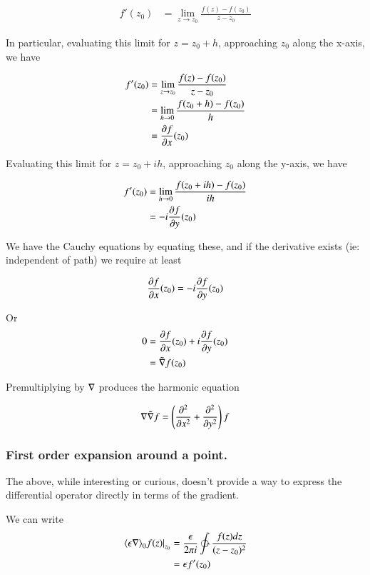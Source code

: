 \documentclass{article}
\newcommand{\PDSq}[2]{\frac{\partial^2 {#2}}{\partial {#1}^2}}
\begin{document}
\begin{align*}
f'(z_0) &= \lim_{z \rightarrow z_0} \frac{ f(z) - f(z_0) }{ z - z_0}
\end{align*}

In particular, evaluating this limit for $z = z_0 + h$, approaching $z_0$ along the x-axis, we have

\begin{align*}
f'(z_0) 
&= \lim_{z \rightarrow z_0} \frac{ f(z) - f(z_0) }{ z - z_0} \\
&= \lim_{h \rightarrow 0} \frac{ f(z_0 + h) - f(z_0) }{ h } \\
&= \PD{x}{f}(z_0)
\end{align*}

Evaluating this limit for $z = z_0 + i h$, approaching $z_0$ along the y-axis, we have

\begin{align*}
f'(z_0) 
&= \lim_{h \rightarrow 0} \frac{ f(z_0 + i h) - f(z_0) }{ i h } \\
&= -i \PD{y}{f}(z_0)
\end{align*}

We have the Cauchy equations by equating these, and if the derivative exists (ie: independent of path) we require at least

\begin{align*}
\PD{x}{f}(z_0) =
-i \PD{y}{f}(z_0)
\end{align*}

Or
\begin{align*}
0 
&=
\PD{x}{f}(z_0) + i \PD{y}{f}(z_0) \\
&=
\tilde{\grad} f(z_0)
\end{align*}

Premultiplying by $\grad$ produces the harmonic equation

\begin{align*}
\grad \tilde{\grad} f = \left( \PDSq{x}{} + \PDSq{y}{} \right) f
\end{align*}

\subsubsection{ First order expansion around a point. }

The above, while interesting or curious, 
doesn't provide a way to express the differential operator directly in terms of the gradient.

We can write 
\begin{align*}
\left. \gpgradezero{ \epsilon \grad } f(z) \right\vert_{z_0}
&=
\frac{\epsilon}{ 2 \pi i } \ointctrclockwise \frac{f(z) dz}{(z - z_0)^{2}} \\
&=
\epsilon f'(z_0)
\end{align*}
\end{document}
